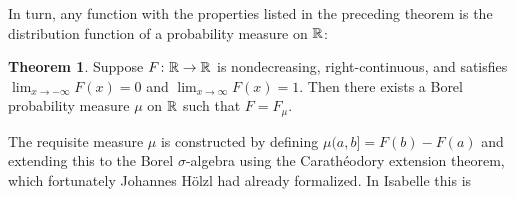 \documentclass{article}
\theoremstyle{definition}
\newtheorem{theorem}{Theorem}[section]
\begin{document}
In turn, any function with the properties listed in the preceding theorem is the distribution function of a probability measure on $\mathbb{R}$:

\begin{theorem}
Suppose $F\colon \mathbb{R} \rightarrow \mathbb{R}$ is nondecreasing, right-continuous, and satisfies $\lim_{x \rightarrow -\infty} F(x) = 0$ and $\lim_{x \rightarrow \infty} F(x) = 1$. Then there exists a Borel probability measure $\mu$ on $\mathbb{R}$ such that $F = F_\mu$.
\end{theorem}

The requisite measure $\mu$ is constructed by defining $\mu (a,b] = F(b) - F(a)$ and extending this to the Borel $\sigma$-algebra using the Carath\'eodory extension theorem, which fortunately Johannes H\"olzl had already formalized. In Isabelle this is

\medskip
\end{document}
